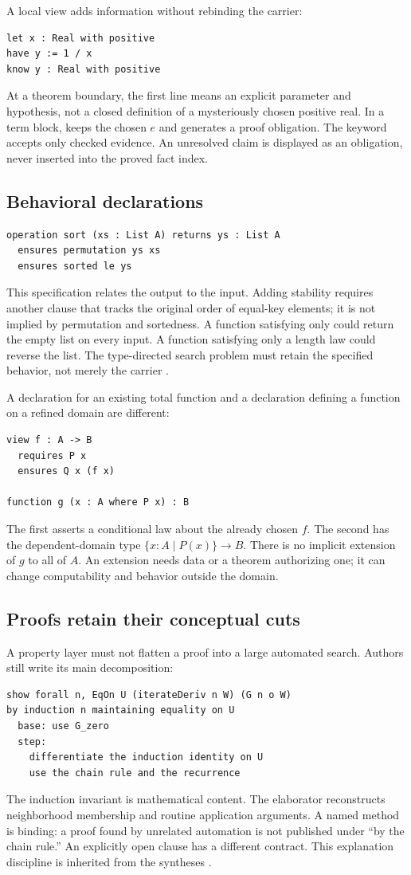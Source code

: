 \documentclass[11pt,letterpaper]{article}
\newcommand{\code}[1]{\texttt{\detokenize{#1}}}
\theoremstyle{definition}
\theoremstyle{remark}
\begin{document}
A local view adds information without rebinding the carrier:
\begin{lstlisting}
let x : Real with positive
have y := 1 / x
know y : Real with positive
\end{lstlisting}
At a theorem boundary, the first line means an explicit parameter and hypothesis,
not a closed definition of a mysteriously chosen positive real. In a term block,
\code{let x := e with positive} keeps the chosen $e$ and generates a proof
obligation. The keyword \code{know} accepts only checked evidence. An unresolved
claim is displayed as an obligation, never inserted into the proved fact index.

\subsection{Behavioral declarations}
\begin{lstlisting}
operation sort (xs : List A) returns ys : List A
  ensures permutation ys xs
  ensures sorted le ys
\end{lstlisting}
This specification relates the output to the input. Adding stability requires
another clause that tracks the original order of equal-key elements; it is not
implied by permutation and sortedness. A function satisfying only \code{sorted}
could return the empty list on every input. A function satisfying only a length
law could reverse the list. The type-directed search problem must retain the
specified behavior, not merely the carrier \code{List A -> List A}.

A declaration for an existing total function and a declaration defining a
function on a refined domain are different:
\begin{lstlisting}
view f : A -> B
  requires P x
  ensures Q x (f x)

function g (x : A where P x) : B
\end{lstlisting}
The first asserts a conditional law about the already chosen $f$. The second
has the dependent-domain type $\{x:A\mid P(x)\}\to B$. There is no implicit
extension of $g$ to all of $A$. An extension needs data or a theorem authorizing
one; it can change computability and behavior outside the domain.

\subsection{Proofs retain their conceptual cuts}
A property layer must not flatten a proof into a large automated search. Authors
still write its main decomposition:
\begin{lstlisting}
show forall n, EqOn U (iterateDeriv n W) (G n o W)
by induction n maintaining equality on U
  base: use G_zero
  step:
    differentiate the induction identity on U
    use the chain rule and the recurrence
\end{lstlisting}
The induction invariant is mathematical content. The elaborator reconstructs
neighborhood membership and routine application arguments. A named method is
binding: a proof found by unrelated automation is not published under ``by the
chain rule.'' An explicitly open \code{by search} clause has a different contract.
This explanation discipline is inherited from the syntheses \cite{syn-a,syn-b}.
\end{document}

